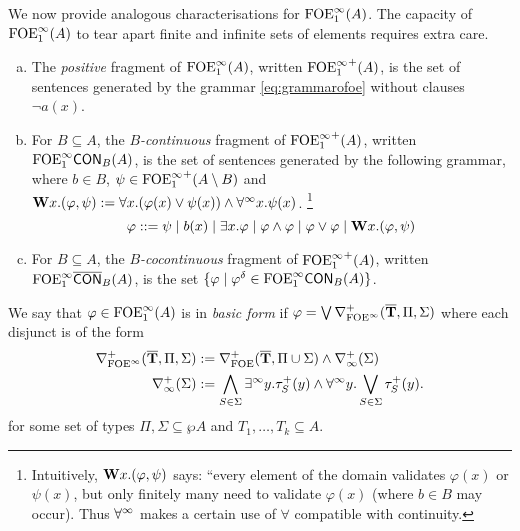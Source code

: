 
We now provide analogous characterisations for $\mathrm{FOE}^{\infty}_1(A)$. The capacity of $\mathrm{FOE}^{\infty}_1(A)$ to tear apart finite and infinite sets of elements requires extra care.

\begin{definition}
\begin{enumerate}[(a)]
\item The \emph{positive} fragment of $\mathrm{FOE}^{\infty}_1(A)$, written ${\mathrm{FOE}^{\infty}_1}^{+}(A)$, is the set of sentences generated by the grammar \eqref{eq:grammarofoe} without clauses $\lnot a(x)$. 
\item For $B \subseteq A$, the \emph{$B$-continuous} fragment of ${\mathrm{FOE}^{\infty}_1}^{+}(A)$, written $\mathrm{FOE}^{\infty}_1\mathsf{CON}_{B}(A)$, is the set of sentences generated by the following grammar, where $b \in B$, $\psi \in {\ensuremath{\mathrm{FOE}^{\infty}_1}}^{+}(A \setminus B)$ and $\mathbf{W} x.(\varphi,\psi) \mathrel{: =} \forall x.(\varphi(x) \lor \psi(x)) \land \forall^\infty x.\psi(x)$. \footnote{Intuitively, $\mathbf{W} x.(\varphi,\psi)$ says: ``every element of the domain validates $\varphi(x)$ or $\psi(x)$, but only finitely many need to validate $\varphi(x)$ (where $b \in B$ may occur). Thus $\forall^\infty$ makes a certain use of $\forall$ compatible with continuity.}%
\[
\varphi ::= \psi \mid b(x) \mid \exists x.\varphi \mid \varphi \land \varphi \mid \varphi \lor \varphi \mid \mathbf{W} x.(\varphi,\psi)
\]
\item For $B \subseteq A$, the \emph{$B$-cocontinuous} fragment of ${\mathrm{FOE}^{\infty}_1}^{+}(A)$, written $\mathrm{FOE}^{\infty}_1\overline{\mathsf{CON}}_{B}(A)$, is the set $\{\varphi \mid \varphi^\delta \in \mathrm{FOE}^{\infty}_1\mathsf{CON}_{B}(A)\}$.
\end{enumerate}
\end{definition}

\begin{definition}\label{def:basicform-ofoei}
We say that $\varphi \in \mathrm{FOE}^{\infty}_1(A)$ is in \emph{basic form} if $\varphi = \bigvee \nabla^+_{\mathrm{FOE}^{\infty}}(\overline{{\mathbf{T}}},\Pi,\Sigma)$ where each disjunct is of the form
\begin{align*}
	\nabla^+_{\mathrm{FOE}^{\infty}}(\overline{{\mathbf{T}}},\Pi,\Sigma) &:= \nabla^+_{\mathrm{FOE}}(\overline{{\mathbf{T}}},\Pi \cup \Sigma) \land \nabla^+_\infty(\Sigma)\\
	\nabla^+_\infty(\Sigma) &:= \bigwedge_{S\in\Sigma} \exists^\infty y.\tau^{+}_S(y) \land \forall^\infty y.\bigvee_{S\in\Sigma} \tau^{+}_S(y) .
\end{align*}
for some set of types $\Pi,\Sigma \subseteq \wp A$ and $T_1, \dots, T_k \subseteq A$.
\end{definition}

